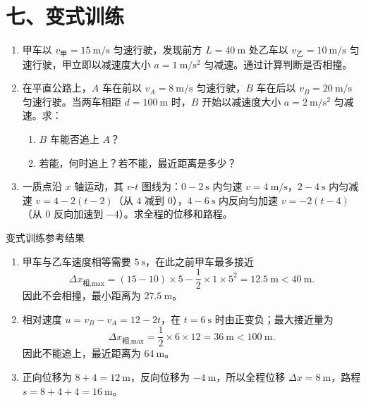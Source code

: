 \section*{七、变式训练}

\begin{enumerate}
  \item 甲车以 $v_{\text{甲}} = 15\ \mathrm{m/s}$ 匀速行驶，发现前方 $L = 40\ \mathrm{m}$ 处乙车以 $v_{\text{乙}} = 10\ \mathrm{m/s}$ 匀速行驶，甲立即以减速度大小 $a = 1\ \mathrm{m/s^2}$ 匀减速。通过计算判断是否相撞。

  \item 在平直公路上，$A$ 车在前以 $v_A = 8\ \mathrm{m/s}$ 匀速行驶，$B$ 车在后以 $v_B = 20\ \mathrm{m/s}$ 匀速行驶。当两车相距 $d = 100\ \mathrm{m}$ 时，$B$ 开始以减速度大小 $a = 2\ \mathrm{m/s^2}$ 匀减速。求：
  \begin{center}
  
  \end{center}
  \begin{enumerate}
    \item $B$ 车能否追上 $A$？
    \item 若能，何时追上？若不能，最近距离是多少？
  \end{enumerate}

  \item 一质点沿 $x$ 轴运动，其 $v$-$t$ 图线为：$0-2\ \mathrm{s}$ 内匀速 $v = 4\ \mathrm{m/s}$，$2-4\ \mathrm{s}$ 内匀减速 $v = 4 - 2(t-2)$（从 $4$ 减到 $0$），$4-6\ \mathrm{s}$ 内反向匀加速 $v = -2(t-4)$（从 $0$ 反向加速到 $-4$）。求全程的位移和路程。
  \begin{center}
  
  \end{center}
\end{enumerate}

\begin{learningbox}{变式训练参考结果}
\begin{enumerate}
  \item 甲车与乙车速度相等需要 $5\ \mathrm{s}$，在此之前甲车最多接近
  \[
  \Delta x_{\text{相,max}}
  =(15-10)\times 5-\frac12\times1\times5^2
  =12.5\ \mathrm{m}<40\ \mathrm{m}.
  \]
  因此不会相撞，最小距离为 $27.5\ \mathrm{m}$。

  \item 相对速度 $u=v_B-v_A=12-2t$，在 $t=6\ \mathrm{s}$ 时由正变负；最大接近量为
  \[
  \Delta x_{\text{相,max}}=\frac12\times6\times12=36\ \mathrm{m}<100\ \mathrm{m}.
  \]
  因此不能追上，最近距离为 $64\ \mathrm{m}$。

  \item 正向位移为 $8+4=12\ \mathrm{m}$，反向位移为 $-4\ \mathrm{m}$，所以全程位移
  $\Delta x=8\ \mathrm{m}$，路程 $s=8+4+4=16\ \mathrm{m}$。
\end{enumerate}
\end{learningbox}

